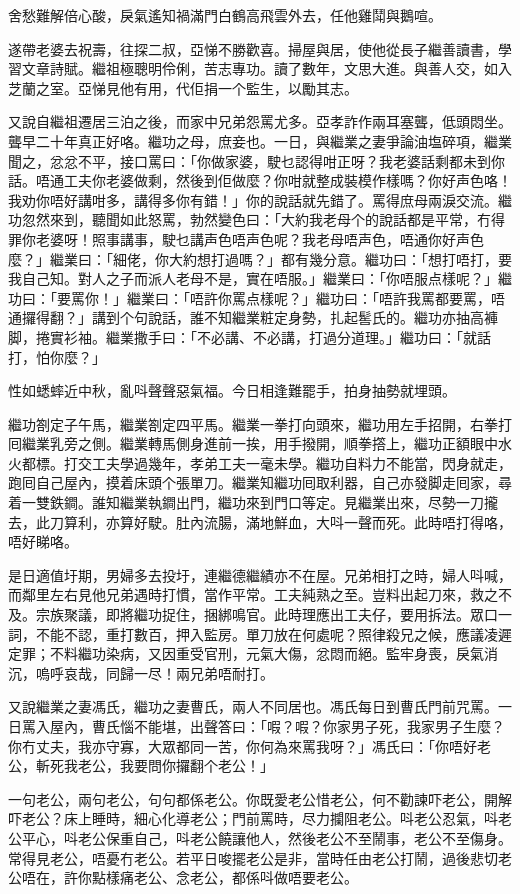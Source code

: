 \documentclass[a5paper, 12pt, openany]{book} %
\begin{document}
	舍愁難解倍心酸，戾氣遙知禍滿門白鶴高飛雲外去，任他雞鬦與鵝喧。

	遂帶老婆去祝壽，往探二叔，亞悌不勝歡喜。掃屋與居，使他從長子繼善讀書，學習文章詩賦。繼祖極聰明伶俐，苦志專功。讀了數年，文思大進。與善人交，如入芝蘭之室。亞悌見他有用，代佢捐一个監生，以勵其志。

	又說自繼祖遷居三泊之後，而家中兄弟怨罵尤多。亞孝詐作兩耳塞聾，低頭悶坐。聾早二十年真正好咯。繼功之母，庶妾也。一日，與繼業之妻爭論油塩碎項，繼業聞之，忿忿不平，接口罵曰：「你做家婆，駛乜認得咁正呀？我老婆話剩都未到你話。唔通工夫你老婆做剩，然後到佢做麼？你咁就整成裝模作樣嗎？你好声色咯！我劝你唔好講咁多，講得多你有錯！」你的說話就先錯了。罵得庶母兩淚交流。繼功忽然來到，聽聞如此怒罵，勃然變色曰：「大約我老母个的說話都是平常，冇得罪你老婆呀！照事講事，駛乜講声色唔声色呢？我老母唔声色，唔通你好声色麼？」繼業曰：「細佬，你大約想打過嗎？」都有幾分意。繼功曰：「想打唔打，要我自己知。對人之子而派人老母不是，實在唔服。」繼業曰：「你唔服点樣呢？」繼功曰：「要罵你！」繼業曰：「唔許你罵点樣呢？」繼功曰：「唔許我罵都要罵，唔通攞得翻？」講到个句說話，誰不知繼業粧定身勢，扎起䯻氏的。繼功亦抽高褲脚，捲實衫袖。繼業撒手曰：「不必講、不必講，打過分道理。」繼功曰：「就話打，怕你麼？」

	性如蟋蟀近中秋，亂呌聲聲惡氣福。今日相逢難罷手，拍身抽勢就埋頭。

	繼功劄定子午馬，繼業劄定四平馬。繼業一拳打向頭來，繼功用左手招開，右拳打囘繼業乳旁之側。繼業轉馬側身進前一挨，用手撥開，順拳撘上，繼功正額眼中水火都標。打交工夫學過幾年，孝弟工夫一毫未學。繼功自料力不能當，閃身就走，跑囘自己屋內，摸着床頭个張單刀。繼業知繼功囘取利器，自己亦發脚走囘家，尋着一雙鉄鐧。誰知繼業執鐧出門，繼功來到門口等定。見繼業出來，尽勢一刀攏去，此刀算利，亦算好駛。肚內流腸，滿地鮮血，大呌一聲而死。此時唔打得咯，唔好睇咯。

	是日適值圩期，男婦多去投圩，連繼德繼績亦不在屋。兄弟相打之時，婦人呌喊，而鄰里左右見他兄弟遇時打慣，當作平常。工夫純熟之至。豈料出起刀來，救之不及。宗族聚議，即將繼功捉住，捆綁鳴官。此時理應出工夫仔，要用拆法。眾口一詞，不能不認，重打數百，押入監房。單刀放在何處呢？照律殺兄之候，應議凌遲定罪；不料繼功染病，又因重受官刑，元氣大傷，忿悶而絕。監牢身喪，戾氣消沉，嗚呼哀哉，同歸一尽！兩兄弟唔耐打。

	又說繼業之妻馮氏，繼功之妻曹氏，兩人不同居也。馮氏每日到曹氏門前咒罵。一日罵入屋內，曹氏惱不能堪，出聲答曰：「㗇？㗇？你家男子死，我家男子生麼？你冇丈夫，我亦守寡，大眾都同一苦，你何為來罵我呀？」馮氏曰：「你唔好老公，斬死我老公，我要問你攞翻个老公！」

	一句老公，兩句老公，句句都係老公。你既愛老公惜老公，何不勸諫吓老公，開解吓老公？床上睡時，細心化導老公；門前罵時，尽力攔阻老公。呌老公忍氣，呌老公平心，呌老公保重自己，呌老公饒讓他人，然後老公不至鬧事，老公不至傷身。常得見老公，唔憂冇老公。若平日唆擺老公是非，當時任由老公打鬧，過後悲切老公唔在，許你點樣痛老公、念老公，都係呌做唔要老公。
\end{document}
